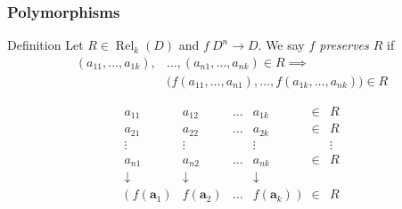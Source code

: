 \documentclass[10pt,xcolor=dvipsnames%
   ]{beamer}
\DeclareMathOperator{\Rel}{Rel}
\renewcommand{\.}{\cdot}
\newcommand{\ba}{\ensuremath{\mathbf{a}}}
\begin{document}
\begin{frame}
  \frametitle{Polymorphisms}

  \begin{exampleblock}{Definition}
    Let $R \in \Rel_k(D)$ and $f\: D^n \to D$. We say 
    \emph{$f$ preserves $R$} if
    \begin{equation*}
      \begin{split}
        (a_{11}, \dots, a_{1k}),&\dots, (a_{n1},\dots, a_{nk}) \in
        R \implies\\ 
        &\bigl( f(a_{11},\dots, a_{n1}), \dots, f(a_{1k},\dots,a_{nk})
        \bigr) \in R
    \end{split}
    \end{equation*}
  \end{exampleblock}

    \begin{equation*}
      \newcommand\flab{\scriptstyle{f}}
      \begin{matrix} a_{11} & a_{12} & \dots & a_{1k} & \in & R \\
        a_{21} & a_{22} & \dots & a_{2k} & \in & R \\
        \vdots  & \vdots &       &\vdots  &     & \vdots \\
        a_{n1} & a_{n2} & \dots & a_{nk} & \in & R \\
        \downarrow &\downarrow &  & \downarrow \\
        (\; f(\ba_1)  & f(\ba_2)  & \dots & f(\ba_k) \; )  & \in & R
      \end{matrix}
    \end{equation*}
\end{frame}
\end{document}

